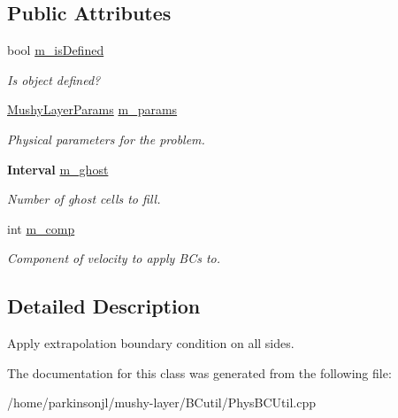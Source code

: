 \subsection*{Public Attributes}
\begin{DoxyCompactItemize}
\item 
\mbox{\label{class_basic_extrap_b_c_function_afedbf88ca74b82464859f699b0634dea}} 
bool \hyperlink{class_basic_extrap_b_c_function_afedbf88ca74b82464859f699b0634dea}{m\+\_\+is\+Defined}
\begin{DoxyCompactList}\small\item\em Is object defined? \end{DoxyCompactList}\item 
\mbox{\label{class_basic_extrap_b_c_function_a746a5c4527d9c8ad96dcbbe2fbc834b0}} 
\hyperlink{class_mushy_layer_params}{Mushy\+Layer\+Params} \hyperlink{class_basic_extrap_b_c_function_a746a5c4527d9c8ad96dcbbe2fbc834b0}{m\+\_\+params}
\begin{DoxyCompactList}\small\item\em Physical parameters for the problem. \end{DoxyCompactList}\item 
\mbox{\label{class_basic_extrap_b_c_function_afe5ec8b6305b652e8ee15db71c8340e6}} 
\textbf{ Interval} \hyperlink{class_basic_extrap_b_c_function_afe5ec8b6305b652e8ee15db71c8340e6}{m\+\_\+ghost}
\begin{DoxyCompactList}\small\item\em Number of ghost cells to fill. \end{DoxyCompactList}\item 
\mbox{\label{class_basic_extrap_b_c_function_a00c04067887286a621897ebb7778fcb1}} 
int \hyperlink{class_basic_extrap_b_c_function_a00c04067887286a621897ebb7778fcb1}{m\+\_\+comp}
\begin{DoxyCompactList}\small\item\em Component of velocity to apply B\+Cs to. \end{DoxyCompactList}\end{DoxyCompactItemize}


\subsection{Detailed Description}
Apply extrapolation boundary condition on all sides. 

The documentation for this class was generated from the following file\+:\begin{DoxyCompactItemize}
\item 
/home/parkinsonjl/mushy-\/layer/\+B\+Cutil/Phys\+B\+C\+Util.\+cpp\end{DoxyCompactItemize}
